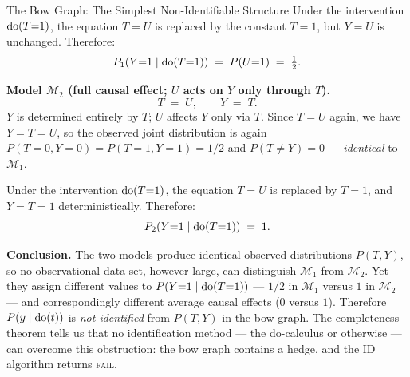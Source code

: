 \documentclass[master.tex]{subfiles}
\begin{document}
\begin{example}{The Bow Graph: The Simplest Non-Identifiable Structure}
Under the intervention $\mathrm{do}(T{=}1)$, the equation $T = U$ is replaced
by the constant $T = 1$, but $Y = U$ is unchanged.  Therefore:
\[
  P_1\!\left(Y{=}1 \mid \mathrm{do}(T{=}1)\right) \;=\; P(U{=}1) \;=\; \tfrac{1}{2}.
\]

\medskip
\noindent\textbf{Model $\mathcal{M}_2$ (full causal effect; $U$ acts on $Y$ only through $T$).}
\[
  T \;=\; U, \qquad Y \;=\; T.
\]
$Y$ is determined entirely by $T$; $U$ affects $Y$ only via $T$.  Since
$T = U$ again, we have $Y = T = U$, so the observed joint distribution is
again $P(T{=}0, Y{=}0) = P(T{=}1, Y{=}1) = 1/2$ and $P(T \neq Y) = 0$
--- \emph{identical} to $\mathcal{M}_1$.

Under the intervention $\mathrm{do}(T{=}1)$, the equation $T = U$ is replaced
by $T = 1$, and $Y = T = 1$ deterministically.  Therefore:
\[
  P_2\!\left(Y{=}1 \mid \mathrm{do}(T{=}1)\right) \;=\; 1.
\]

\medskip
\noindent\textbf{Conclusion.}  The two models produce identical observed
distributions $P(T,Y)$, so no observational data set, however large, can
distinguish $\mathcal{M}_1$ from $\mathcal{M}_2$.  Yet they assign
different values to $P(Y{=}1 \mid \mathrm{do}(T{=}1))$ --- $1/2$ in
$\mathcal{M}_1$ versus $1$ in $\mathcal{M}_2$ --- and correspondingly
different average causal effects ($0$ versus $1$).  Therefore
$P(y \mid \mathrm{do}(t))$ is \emph{not identified} from $P(T, Y)$ in the bow
graph.  The completeness theorem tells us that no identification method
--- the do-calculus or otherwise --- can overcome this obstruction: the
bow graph contains a hedge, and the ID algorithm returns
\textsc{fail}.
\end{example}
\end{document}
